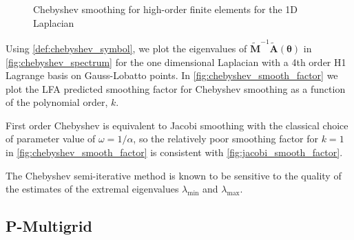 \documentclass[review]{siamart190516}
\begin{document}
\begin{figure}[!tbp]
  \centering
  \hfill
  \caption{Chebyshev smoothing for high-order finite elements for the 1D Laplacian}
\end{figure}

Using \cref{def:chebyshev_symbol}, we plot the eigenvalues of $\tilde{\mathbf{M}}^{-1} \tilde{\mathbf{A}} \left( \boldsymbol{\theta} \right)$ in \cref{fig:chebyshev_spectrum} for the one dimensional Laplacian with a 4th order H1 Lagrange basis on Gauss-Lobatto points.
In \cref{fig:chebyshev_smooth_factor} we plot the LFA predicted smoothing factor for Chebyshev smoothing as a function of the polynomial order, $k$.

First order Chebyshev is equivalent to Jacobi smoothing with the classical choice of parameter value of $\omega = 1 / \alpha$, so the relatively poor smoothing factor for $k = 1$ in \cref{fig:chebyshev_smooth_factor} is consistent with \cref{fig:jacobi_smooth_factor}.

The Chebyshev semi-iterative method is known to be sensitive to the quality of the estimates of the extremal eigenvalues $\lambda_{\text{min}}$ and $\lambda_{\text{max}}$.

\subsection{P-Multigrid}\label{sec:multigrid}
\end{document}
